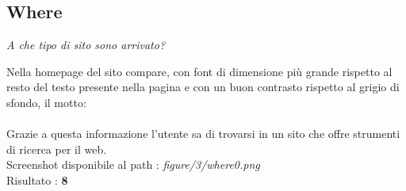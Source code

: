 \subsection{Where}\label{where}
\begin{center}

\textit{A che tipo di sito sono arrivato?}

\end{center}
\begin{flushleft}
Nella homepage del sito compare, con font  di dimensione
più grande rispetto al resto del testo presente nella pagina e con un buon
contrasto rispetto al grigio di sfondo, il motto: \\
 \\
Grazie a questa informazione l'utente sa di trovarsi in un sito che offre
strumenti di ricerca per il web. \\
Screenshot disponibile al path : \textit{figure/3/where0.png} \\
Risultato : \textbf{8}
\end{flushleft}